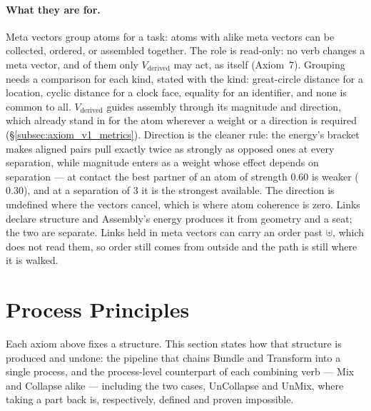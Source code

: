 \documentclass[12pt, a4paper]{article}
\begin{document}
\paragraph{What they are for.} Meta vectors group atoms for a task: atoms
with alike meta vectors can be collected, ordered, or assembled
together. The role is read-only: no verb changes a meta vector, and of them only
$V_{\text{derived}}$ may act, as itself (Axiom~7). Grouping needs a comparison for each kind, stated with the kind:
great-circle distance for a location, cyclic distance for a clock face,
equality for an identifier, and none is common to all.
$V_{\text{derived}}$ guides assembly through its magnitude and
direction, which already stand in for the atom wherever a weight or a
direction is required (\S\ref{subsec:axiom_v1_metrics}). Direction is
the cleaner rule: the energy's bracket makes aligned pairs pull exactly
twice as strongly as opposed ones at every separation, while magnitude
enters as a weight whose effect depends on separation --- at contact the
best partner of an atom of strength $0.60$ is weaker ($0.30$), and at a
separation of $3$ it is the strongest available. The direction is
undefined where the vectors cancel, which is where atom coherence is
zero. Links declare structure and Assembly's energy produces it from
geometry and a seat; the two are separate. Links held in meta vectors
can carry an order past $\uplus$, which does not read them, so order
still comes from outside and the path is still where it is walked.

\section{Process Principles}
\label{sec:process_principles}
Each axiom above fixes a structure. This section states how that
structure is produced and undone: the pipeline that chains Bundle
and Transform into a single process, and the process-level
counterpart of each combining verb --- Mix and Collapse alike ---
including the two cases, UnCollapse and UnMix, where taking a part back is, respectively, defined and proven impossible.
\end{document}
